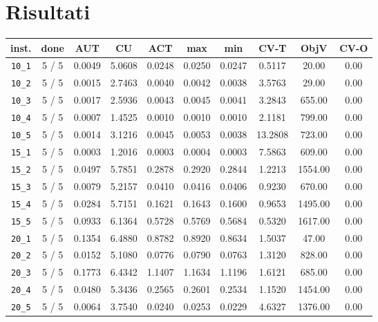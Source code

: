 \section{Risultati}

\begin{table}[h!]
\begin{center}
\small
\begin{tabular}{| c | c | c | c | c | c | c | c | c | c |}
\hline
inst. & done & AUT & CU & ACT & max & min & CV-T & ObjV & CV-O \\
\hline
\verb|10_1| & 5 / 5 & 0.0049 & 5.0608 & 0.0248 & 0.0250 & 0.0247 & 0.5117 & 20.00 & 0.00\\ 
\verb|10_2| & 5 / 5 & 0.0015 & 2.7463 & 0.0040 & 0.0042 & 0.0038 & 3.5763 & 29.00 & 0.00\\ 
\verb|10_3| & 5 / 5 & 0.0017 & 2.5936 & 0.0043 & 0.0045 & 0.0041 & 3.2843 & 655.00 & 0.00\\ 
\verb|10_4| & 5 / 5 & 0.0007 & 1.4525 & 0.0010 & 0.0010 & 0.0010 & 2.1181 & 799.00 & 0.00\\ 
\verb|10_5| & 5 / 5 & 0.0014 & 3.1216 & 0.0045 & 0.0053 & 0.0038 & 13.2808 & 723.00 & 0.00\\ 
\verb|15_1| & 5 / 5 & 0.0003 & 1.2016 & 0.0003 & 0.0004 & 0.0003 & 7.5863 & 609.00 & 0.00\\ 
\verb|15_2| & 5 / 5 & 0.0497 & 5.7851 & 0.2878 & 0.2920 & 0.2844 & 1.2213 & 1554.00 & 0.00\\ 
\verb|15_3| & 5 / 5 & 0.0079 & 5.2157 & 0.0410 & 0.0416 & 0.0406 & 0.9230 & 670.00 & 0.00\\ 
\verb|15_4| & 5 / 5 & 0.0284 & 5.7151 & 0.1621 & 0.1643 & 0.1600 & 0.9653 & 1495.00 & 0.00\\ 
\verb|15_5| & 5 / 5 & 0.0933 & 6.1364 & 0.5728 & 0.5769 & 0.5684 & 0.5320 & 1617.00 & 0.00\\ 
\verb|20_1| & 5 / 5 & 0.1354 & 6.4880 & 0.8782 & 0.8920 & 0.8634 & 1.5037 & 47.00 & 0.00\\ 
\verb|20_2| & 5 / 5 & 0.0152 & 5.1080 & 0.0776 & 0.0790 & 0.0763 & 1.3120 & 828.00 & 0.00\\ 
\verb|20_3| & 5 / 5 & 0.1773 & 6.4342 & 1.1407 & 1.1634 & 1.1196 & 1.6121 & 685.00 & 0.00\\ 
\verb|20_4| & 5 / 5 & 0.0480 & 5.3436 & 0.2565 & 0.2601 & 0.2534 & 1.1520 & 1454.00 & 0.00\\ 
\verb|20_5| & 5 / 5 & 0.0064 & 3.7540 & 0.0240 & 0.0253 & 0.0229 & 4.6327 & 1376.00 & 0.00\\ 

\end{tabular}
\end{center}
\end{table}
